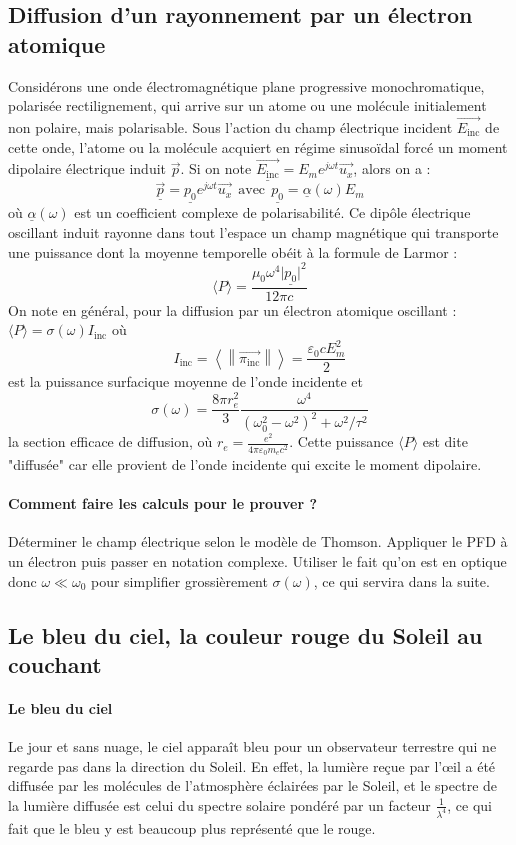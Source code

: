 \documentclass[french]{book}
\theoremstyle{plain}
\theoremstyle{definition}
\theoremstyle{remark}
\begin{document}
\subsection{Diffusion d'un rayonnement par un électron atomique}
Considérons une onde électromagnétique plane progressive monochromatique, polarisée rectilignement, qui arrive sur un atome ou une molécule initialement non polaire, mais polarisable. Sous l'action du champ électrique incident $\overrightarrow{E_\text{inc}}$ de cette onde, l'atome ou la molécule acquiert en régime sinusoïdal forcé un moment dipolaire électrique induit $\overrightarrow{p}$. Si on note $\underline{\overrightarrow{E_\text{inc}}}=E_me^{j\omega t}\overrightarrow{u_x}$, alors on a : $$\underline{\overrightarrow{p}}=\underline{p_0}e^{j\omega t}\overrightarrow{u_x} \ \ \text{avec} \ \ \underline{p_0}=\underline{\alpha}(\omega)E_m$$ où $\underline{\alpha}(\omega)$ est un coefficient complexe de polarisabilité. Ce dipôle électrique oscillant induit rayonne dans tout l'espace un champ magnétique qui transporte une puissance dont la moyenne temporelle obéit à la formule de Larmor : $$\langle P\rangle=\frac{\mu_0\omega^4\lvert\underline{p_0}\rvert^2}{12\pi c}$$ On note en général, pour la diffusion par un électron atomique oscillant : $\langle P\rangle=\sigma(\omega)I_\text{inc}$ où $$I_\text{inc}=\left\langle\left\lVert\overrightarrow{\pi_{\text{inc}}}\right\rVert \right\rangle=\frac{\varepsilon_0cE_m^2}{2}$$ est la puissance surfacique moyenne de l'onde incidente et $$\sigma(\omega)=\frac{8\pi r_e^2}{3}\frac{\omega^4}{(\omega_0^2-\omega^2)^2+\omega^2/\tau^2}$$ la section efficace de diffusion, où $\displaystyle r_e=\frac{e^2}{4\pi\varepsilon_0 m_ec^2}$. Cette puissance $\langle P\rangle$ est dite "diffusée" car elle provient de l'onde incidente qui excite le moment dipolaire.
\paragraph{Comment faire les calculs pour le prouver ?} Déterminer le champ électrique selon le modèle de Thomson. Appliquer le PFD à un électron puis passer en notation complexe. Utiliser le fait qu'on est en optique donc $\omega\ll\omega_0$ pour simplifier grossièrement $\sigma(\omega)$, ce qui servira dans la suite.
\subsection{Le bleu du ciel, la couleur rouge du Soleil au couchant}
\paragraph{Le bleu du ciel}Le jour et sans nuage, le ciel apparaît bleu pour un observateur terrestre qui ne regarde pas dans la direction du Soleil. En effet, la lumière reçue par l'œil a été diffusée par les molécules de l'atmosphère éclairées par le Soleil, et le spectre de la lumière diffusée est celui du spectre solaire pondéré par un facteur $\displaystyle\frac{1}{\lambda^4}$, ce qui fait que le bleu y est beaucoup plus représenté que le rouge.
\end{document}
